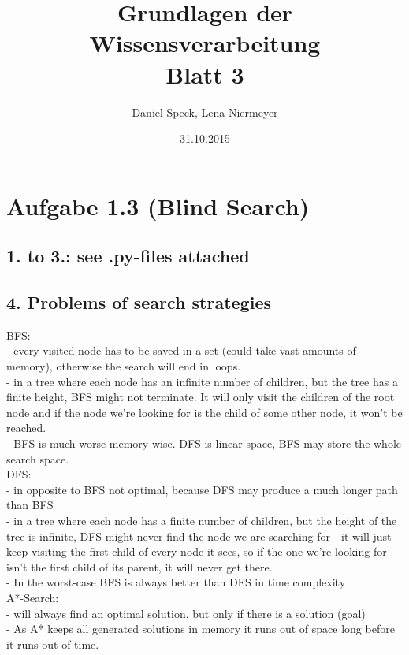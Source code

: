 \documentclass[10pt,a4paper]{article}
\title{\textbf{\huge Grundlagen der Wissensverarbeitung
\\\Large Blatt 3}}
\author{Daniel Speck, Lena Niermeyer}
\date{31.10.2015}
\begin{document}
	\maketitle


	
	\section*{Aufgabe 1.3 (Blind Search)}
	
		\subsection*{1. to 3.: see .py-files attached}
	
	\subsection*{4. Problems of search strategies}

	BFS: \\
	- every visited node has to be saved in a set (could take vast amounts of memory), otherwise the search will end in loops. \\
	- in a tree where each node has an infinite number of children, but the tree has a finite height, BFS might not terminate. It will only visit the children of the root node and if the node we're looking for is the child of some other node, it won't be reached. \\
	- BFS is much worse memory-wise. DFS is linear space, BFS may store the whole search space. \\
	
	DFS: \\
	- in opposite to BFS not optimal, because DFS may produce a much longer path than BFS \\
	- in a tree where each node has a finite number of children, but the height of the tree is infinite, DFS might never find the node we are searching for - it will just keep visiting the first child of every node it sees, so if the one we're looking for isn't the first child of its parent, it will never get there. \\
	- In the worst-case BFS is always better than DFS in time complexity \\
	
	A*-Search: \\
	- will always find an optimal solution, but only if there is a solution (goal) \\
	- As A* keeps all generated solutions in memory it 
	runs out of space long before it runs out of time.
	
\end{document}
